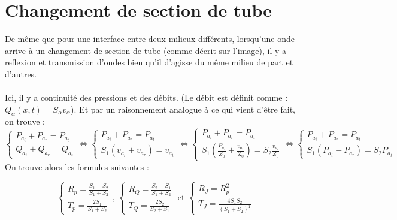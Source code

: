 \section{Changement de section de tube}
De même que pour une interface entre deux milieux différents, lorsqu'une onde arrive à un changement de section de tube (comme décrit sur l'image), il y a reflexion et transmission d'ondes bien qu'il d'agisse du même milieu de part et d'autres. \\\\
Ici, il y a continuité des pressions et des débits. (Le débit est définit comme : $Q_\alpha(x,t)=S_\alpha v_\alpha$). Et par un raisonnement analogue à ce qui vient d'être fait, on trouve : 
\[
\left\{
\begin{array}{l}
P_{a_i}+P_{a_r}=P_{a_t} \\
Q_{a_t}+Q_{a_r}=Q_{a_t}
\end{array}
\right.
\Leftrightarrow
\left\{
\begin{array}{l}
P_{a_i}+P_{a_r}=P_{a_t} \\
S_1(v_{a_i}+v_{a_r})=v_{a_t}
\end{array}
\right.
\Leftrightarrow
\left\{
\begin{array}{l}
P_{a_i}+P_{a_r}=P_{a_t} \\
S_1(\frac{P_{a_i}}{Z_0}+\frac{v_{a_r}}{Z_0})=S_2\frac{v_{a_t}}{Z_0}
\end{array}
\right.
\Leftrightarrow
\left\{
\begin{array}{l}
P_{a_i}+P_{a_r}=P_{a_t} \\
S_1(P_{a_i}-P_{a_r})=S_2P_{a_t}
\end{array}
\right.
\]
On trouve alors les formules suivantes :

\[
\left\{
\begin{array}{ll}
R_p=\frac{S_1-S_2}{S_1+S_2} \\
T_p=\frac{2S_1}{S_1+S_2}
\end{array}
\right.
\textrm{, }
\left\{
\begin{array}{ll}
R_Q=\frac{S_2-S_1}{S_1+S_2} \\
T_Q=\frac{2S_2}{S_2+S_1}
\end{array}
\right.
\textrm{ et }
\left\{
\begin{array}{ll}
R_J=R_p^2 \\
T_J=\frac{4S_1S_2}{(S_1+S_2)^1}
\end{array}
\right.
\]

